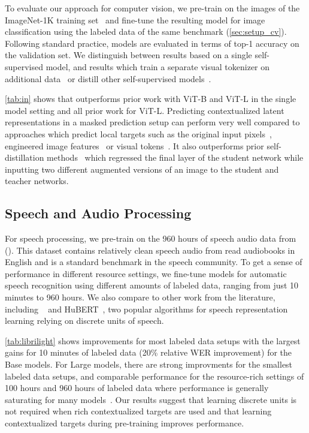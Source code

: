 \documentclass[nohyperref]{article}
\theoremstyle{plain}
\theoremstyle{definition}
\theoremstyle{remark}
\begin{document}
\insertINtable

To evaluate our approach for computer vision, we pre-train \name{} on the images of the ImageNet-1K training set~\citep{deng2009imagenet} and fine-tune the resulting model for image classification using the labeled data of the same benchmark (\textsection\ref{sec:setup_cv}).
Following standard practice, models are evaluated in terms of top-1 accuracy on the validation set.
We distinguish between results based on a single self-supervised model, and results which train a separate visual tokenizer on additional data~\citep{bao2021beit} or distill other self-supervised models~\citep{dong2022peco}.

\insertLLtable

\autoref{tab:in} shows that \name{} outperforms prior work with ViT-B and ViT-L in the single model setting and all prior work for ViT-L.
Predicting contextualized latent representations in a masked prediction setup can perform very well compared to approaches which predict local targets such as  the original input pixels~\citep{he2021mae,xie2021simmim}, engineered image features~\citep{wei2021masked} or visual tokens~\citep{bao2021beit}.
It also outperforms prior self-distillation methods~\citep{caron2021dino} which regressed the final layer of the student network while inputting two different augmented versions of an image to the student and teacher networks.



\subsection{Speech and Audio Processing}
\label{sec:results_speech}

For speech processing, we pre-train \name{} on the 960 hours of speech audio data from \libri{} (\librisz{}). 
This dataset contains relatively clean speech audio from read audiobooks in English and is a standard benchmark in the speech community.
To get a sense of performance in different resource settings, we fine-tune models for automatic speech recognition using different amounts of labeled data, ranging from just 10 minutes to 960 hours.
We also compare to other work from the literature, including \wvpp{}~\citep{baevski2020wav} and HuBERT~\citep{hsu2020hubert}, two popular algorithms for speech representation learning relying on discrete units of speech.


\autoref{tab:librilight} shows improvements for most labeled data setups with the largest gains for 10 minutes of labeled data (20\% relative WER improvement) for the Base models.
For Large models, there are strong improvments for the smallest labeled data setups, and comparable performance for the resource-rich settings of 100 hours and 960 hours of labeled data where performance is generally saturating for many models~\citep{zhang2020pushing,chung2021w2vbert}.
Our results suggest that learning discrete units is not required when rich contextualized targets are used and that learning contextualized targets during pre-training improves performance.
\end{document}
